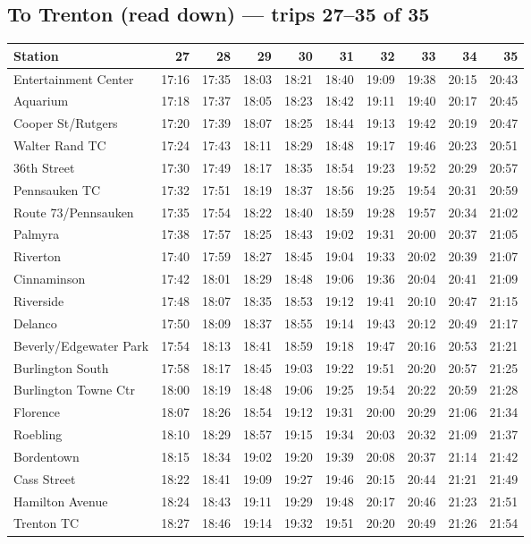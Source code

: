 \subsection*{To Trenton (read down) --- trips 27--35 of 35}
\begin{center}\footnotesize\setlength{\tabcolsep}{3pt}\begin{tabular}{@{}lrrrrrrrrr@{}}\toprule
Station & 27 & 28 & 29 & 30 & 31 & 32 & 33 & 34 & 35 \\\midrule
Entertainment Center & 17:16 & 17:35 & 18:03 & 18:21 & 18:40 & 19:09 & 19:38 & 20:15 & 20:43 \\
Aquarium & 17:18 & 17:37 & 18:05 & 18:23 & 18:42 & 19:11 & 19:40 & 20:17 & 20:45 \\
Cooper St/Rutgers & 17:20 & 17:39 & 18:07 & 18:25 & 18:44 & 19:13 & 19:42 & 20:19 & 20:47 \\
Walter Rand TC & 17:24 & 17:43 & 18:11 & 18:29 & 18:48 & 19:17 & 19:46 & 20:23 & 20:51 \\
36th Street & 17:30 & 17:49 & 18:17 & 18:35 & 18:54 & 19:23 & 19:52 & 20:29 & 20:57 \\
Pennsauken TC & 17:32 & 17:51 & 18:19 & 18:37 & 18:56 & 19:25 & 19:54 & 20:31 & 20:59 \\
Route 73/Pennsauken & 17:35 & 17:54 & 18:22 & 18:40 & 18:59 & 19:28 & 19:57 & 20:34 & 21:02 \\
Palmyra & 17:38 & 17:57 & 18:25 & 18:43 & 19:02 & 19:31 & 20:00 & 20:37 & 21:05 \\
Riverton & 17:40 & 17:59 & 18:27 & 18:45 & 19:04 & 19:33 & 20:02 & 20:39 & 21:07 \\
Cinnaminson & 17:42 & 18:01 & 18:29 & 18:48 & 19:06 & 19:36 & 20:04 & 20:41 & 21:09 \\
Riverside & 17:48 & 18:07 & 18:35 & 18:53 & 19:12 & 19:41 & 20:10 & 20:47 & 21:15 \\
Delanco & 17:50 & 18:09 & 18:37 & 18:55 & 19:14 & 19:43 & 20:12 & 20:49 & 21:17 \\
Beverly/Edgewater Park & 17:54 & 18:13 & 18:41 & 18:59 & 19:18 & 19:47 & 20:16 & 20:53 & 21:21 \\
Burlington South & 17:58 & 18:17 & 18:45 & 19:03 & 19:22 & 19:51 & 20:20 & 20:57 & 21:25 \\
Burlington Towne Ctr & 18:00 & 18:19 & 18:48 & 19:06 & 19:25 & 19:54 & 20:22 & 20:59 & 21:28 \\
Florence & 18:07 & 18:26 & 18:54 & 19:12 & 19:31 & 20:00 & 20:29 & 21:06 & 21:34 \\
Roebling & 18:10 & 18:29 & 18:57 & 19:15 & 19:34 & 20:03 & 20:32 & 21:09 & 21:37 \\
Bordentown & 18:15 & 18:34 & 19:02 & 19:20 & 19:39 & 20:08 & 20:37 & 21:14 & 21:42 \\
Cass Street & 18:22 & 18:41 & 19:09 & 19:27 & 19:46 & 20:15 & 20:44 & 21:21 & 21:49 \\
Hamilton Avenue & 18:24 & 18:43 & 19:11 & 19:29 & 19:48 & 20:17 & 20:46 & 21:23 & 21:51 \\
Trenton TC & 18:27 & 18:46 & 19:14 & 19:32 & 19:51 & 20:20 & 20:49 & 21:26 & 21:54 \\
\bottomrule\end{tabular}\end{center}

